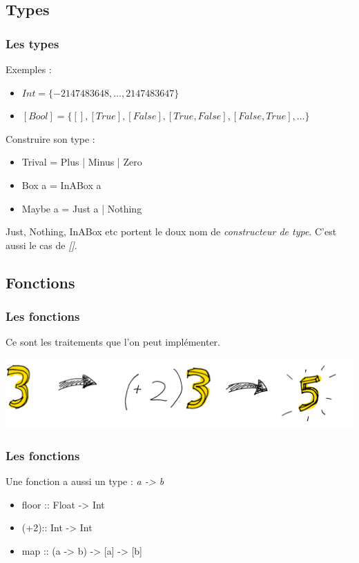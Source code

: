 \documentclass{beamer}
\begin{document}
\subsection{Types}
\begin{frame}
\frametitle{Les types}
\begin{exampleblock}{Exemples :}
\begin{itemize}
\item $Int = \{-2 147 483 648, \dots, 2 147 483 647\}$
\item $[Bool] = \{[], [True], [False], [True, False], [False, True], \dots\}$
\end{itemize}

\end{exampleblock}

\begin{block}{Construire son type :}
\begin{itemize}
\item Trival = Plus | Minus | Zero
\item Box a = InABox a
\item Maybe a = Just a | Nothing
\end{itemize}
\end{block}

\pause

Just, Nothing, InABox etc portent le doux nom de \emph{constructeur de type}. C'est aussi le cas de \emph{[]}.
\end{frame}

\subsection{Fonctions}
\begin{frame}
\frametitle{Les fonctions}
\begin{block}{}
Ce sont les traitements que l'on peut implémenter.
\end{block}
\begin{center}
\includegraphics[scale=0.2]{fct.png}
\end{center}
\end{frame}


\begin{frame}
\frametitle{Les fonctions}
\begin{block}{Une fonction a aussi un type : \emph{a -> b}}
\begin{itemize}
\item floor   :: Float -> Int
\item (+2):: Int -> Int
\item map :: (a -> b) -> [a] -> [b]
\end{itemize}
\end{block}

\end{frame}
\end{document}
